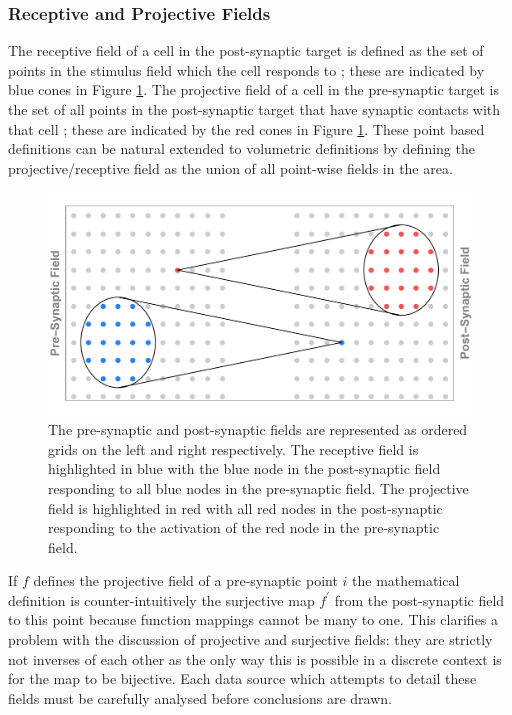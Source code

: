 \subsubsection{Receptive and Projective Fields} \label{section:receptivefield}
The receptive field of a cell in the post-synaptic target is defined as the set of points in the stimulus field which the cell responds to \cite{Sherrington1906-et}; these are indicated by blue cones in Figure \ref{fig:projectivereceptivefield}. The projective field of a cell in the pre-synaptic target is the set of all points in the post-synaptic target that have synaptic contacts with that cell \cite{Lehky1988-nt}; these are indicated by the red cones in Figure \ref{fig:projectivereceptivefield}. These point based definitions can be natural extended to volumetric definitions by defining the projective/receptive field as the union of all point-wise fields in the area. 

\begin{figure}[h!]
	\centering
	\includegraphics[width = \textwidth]{images/introduction/receptiveprojectivefields}
	\def\c{The pre-synaptic and post-synaptic fields are represented as ordered grids on the left and right respectively. }
	\caption[\c]{\label{fig:projectivereceptivefield} \c The receptive field is highlighted in blue with the blue node in the post-synaptic field responding to all blue nodes in the pre-synaptic field. The projective field is highlighted in red with all red nodes in the post-synaptic responding to the activation of the red node in the pre-synaptic field.} 
\end{figure}
If $f$ defines the projective field of a pre-synaptic point $i$ the mathematical definition is counter-intuitively the surjective map $f^\prime$ from the post-synaptic field to this point because function mappings cannot be many to one. This clarifies a problem with the discussion of projective and surjective fields: they are strictly not inverses of each other as the only way this is possible in a discrete context is for the map to be bijective. Each data source which attempts to detail these fields must be carefully analysed before conclusions are drawn.

